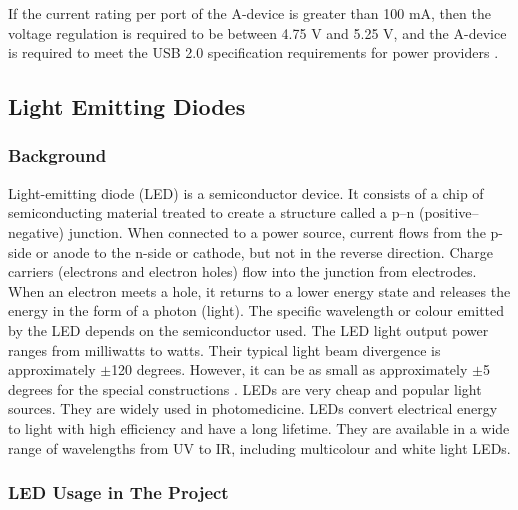 If the current rating per port of the A-device is greater than 100 mA, then the voltage regulation is required to be between 4.75 V and 5.25 V, and the A-device is required to meet the USB 2.0 specification requirements for power providers \parencite{otg}.


\subsection{Light Emitting Diodes}
\subsubsection{Background}
Light-emitting diode (LED) is a semiconductor device. It consists of a chip of semiconducting material treated to create a structure called a p–n (positive–negative) junction. When connected to a power source, current flows from the p-side or anode to the n-side or cathode, but not in the reverse direction. Charge carriers (electrons and electron holes) flow into the junction from electrodes. When an electron meets a hole, it returns to a lower energy state and releases the energy in the form of a photon (light)\parencite{led}. The specific wavelength or colour emitted by the LED depends on the semiconductor used. The LED light output power ranges from milliwatts to watts. Their typical light beam divergence is approximately $\pm$120 degrees. However, it can be as small as approximately $\pm$5 degrees for the special constructions \parencite{led} . LEDs are very cheap and popular light sources. They are widely used in photomedicine. LEDs convert electrical energy to light with high efficiency and have a long lifetime. They are available in a wide range of wavelengths from UV to IR, including multicolour and white light LEDs. 

\subsubsection{LED Usage in The Project}
